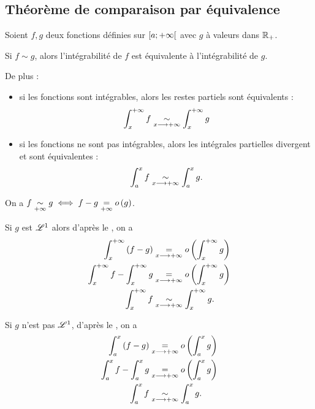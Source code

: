 \subsection{Théorème de comparaison par équivalence}

\begin{theo}
Soient \(f,g\) deux fonctions définies sur \(\left[a;+\infty\right[\) avec \(g\) à valeurs dans \(\mathbb{R}_+\).

Si \(f\sim g\), alors l'intégrabilité de \(f\) est équivalente à l'intégrabilité de \(g\).

De plus :

\begin{itemize}
    \item si les fonctions sont intégrables, alors les restes partiels sont équivalents : \[\int_x^{+\infty}f\underset{x\longrightarrow+\infty}{\sim}\int_x^{+\infty}g\]
    \item si les fonctions ne sont pas intégrables, alors les intégrales partielles divergent et sont équivalentes : \[\int_a^xf\underset{x\longrightarrow+\infty}{\sim}\int_a^xg.\]
\end{itemize}
\end{theo}

\begin{dem}
On a \(f\underset{+\infty}{\sim}g\iff f-g\underset{+\infty}{=}o\left(g\right)\).

Si \(g\) est \(\integ{1}{}{}\) alors d'après le , on a \[\begin{aligned}
\int_x^{+\infty}\left(f-g\right)&\underset{x\longrightarrow+\infty}{=}o\left(\int_x^{+\infty}g\right) \\
\int_x^{+\infty}f-\int_x^{+\infty}g&\underset{x\longrightarrow+\infty}{=}o\left(\int_x^{+\infty}g\right) \\
\int_x^{+\infty}f&\underset{x\longrightarrow+\infty}{\sim}\int_x^{+\infty}g.
\end{aligned}\]

Si \(g\) n'est pas \(\integ{1}{}{}\), d'après le , on a \[\begin{aligned}
\int_a^x\left(f-g\right)&\underset{x\longrightarrow+\infty}{=}o\left(\int_a^xg\right) \\
\int_a^xf-\int_a^xg&\underset{x\longrightarrow+\infty}{=}o\left(\int_a^xg\right) \\
\int_a^xf&\underset{x\longrightarrow+\infty}{\sim}\int_a^xg.
\end{aligned}\]
\end{dem}
